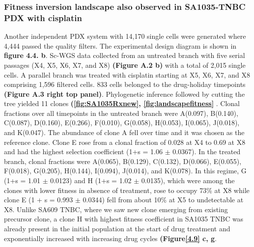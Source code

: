\subsubsection{Fitness inversion landscape also observed in SA1035-TNBC PDX with cisplatin}
Another independent PDX system with 14,170 single cells were generated where 4,444 passed the quality filters. The experimental design diagram is shown in \textbf{figure 4.4. b}.
Sc-WGS data collected from an untreated branch with five serial passages (X4, X5, X6, X7, and X8) \textbf{(Figure A.2 b)} with a total of 2,015 single cells. A parallel branch was treated with cisplatin starting at X5, X6, X7, and X8 comprising 1,596 filtered cells. 833 cells belonged to the drug-holiday timepoints \textbf{(Figure A.3 right top panel)}. Phylogenetic inference followed by cutting the tree yielded 11 clones \textbf{(\autoref{fig:SA1035Rxnew}, \autoref{fig:landscapefitness}} . Clonal fractions over all timepoints in the untreated branch were A(0.097), B(0.140), C(0.087), D(0.160), E(0.266), F(0.010), G(0.058), H(0.053), I(0.065), J(0.018), and K(0.047). The abundance of clone A fell over time and it was chosen as the reference clone. Clone E rose from a clonal fraction of 0.028 at X4 to 0.69 at X8 and had the highest selection coefficient (1+s = 1.06 $\pm$ 0.0367). In the treated branch, clonal fractions were A(0.065), B(0.129), C(0.132), D(0.066), E(0.055), F(0.018), G(0.205), H(0.144), I(0.094), J(0.014), and K(0.078). In this regime, G (1+s = 1.01 $\pm$ 0.0123) and H (1+s = 1.02 $\pm$ 0.0135), which were among the clones with lower fitness in absence of treatment, rose to occupy 73\% at X8 while clone E (1 + s = 0.993 $\pm$ 0.0344) fell from about 10\% at X5 to undetectable at X8. Unlike SA609 TNBC, where we saw new clone emerging from existing precursor clone, a clone H with highest fitness coefficient in SA1035 TNBC was already present in the initial population at the start of drug treatment and exponentially increased with increasing drug cycles \textbf{(Figure\ref{4.9} c, g}. 

